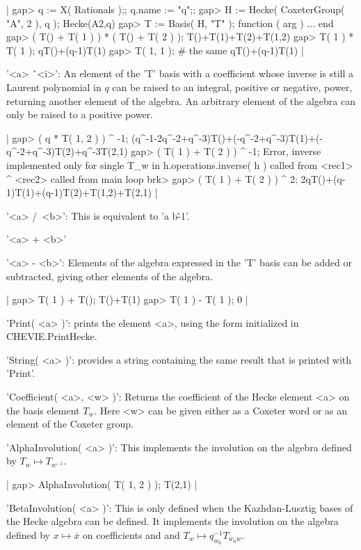 |    gap> q := X( Rationals );; q.name := "q";;
    gap> H := Hecke( CoxeterGroup( "A", 2 ), q );
    Hecke(A2,q)
    gap> T := Basis( H, "T" );
    function ( arg ) ... end
    gap> ( T() + T( 1 ) ) * ( T() + T( 2 ) );
    T()+T(1)+T(2)+T(1,2)
    gap> T( 1 ) * T( 1 );
    qT()+(q-1)T(1)
    gap> T( 1, 1 ); # the same
    qT()+(q-1)T(1) |

'<a> \^\ <i>':
An  element of the  'T' basis with  a coefficient whose  inverse is still a
Laurent  polynomial  in  $q$  can  be  raised  to  an integral, positive or
negative,  power, returning  another element  of the  algebra. An arbitrary
element of the algebra can only be raised to a positive power.

|    gap> ( q * T( 1, 2 ) ) ^ -1;
    (q^-1-2q^-2+q^-3)T()+(-q^-2+q^-3)T(1)+(-q^-2+q^-3)T(2)+q^-3T(2,1)
    gap> ( T( 1 ) + T( 2 ) ) ^ -1;
    Error, inverse implemented only for single T_w in
    h.operations.inverse( h ) called from
    <rec1> ^ <rec2> called from
    main loop
    brk>
    gap> ( T( 1 ) + T( 2 ) ) ^ 2;
    2qT()+(q-1)T(1)+(q-1)T(2)+T(1,2)+T(2,1) |

'<a> /\ <b>': This is equivalent to 'a\* b\^-1'.

'<a> + <b>'

'<a> - <b>':
Elements of the  algebra  expressed in  the  'T'  basis can be   added or
subtracted, giving other elements of the algebra.

|    gap> T( 1 ) + T();
    T()+T(1)
    gap> T( 1 ) - T( 1 );
    0 |

'Print( <a> )':
prints the element <a>, using the form initialized in CHEVIE.PrintHecke.

'String( <a> )':
provides a  string  containing  the same  result  that  is  printed  with
'Print'.

'Coefficient( <a>, <w> )':
Returns the  coefficient of the Hecke  element <a> on the  basis element
$T_w$. Here <w> can  be given either as a Coxeter word  or as an element
of the Coxeter group.

'AlphaInvolution( <a> )':
This   implements the involution   on the algebra  defined by $T_w\mapsto
T_{w^{-1}}$.

|    gap> AlphaInvolution( T( 1, 2 ) );
    T(2,1) |

'BetaInvolution( <a> )':
This  is  only defined  when  the  Kazhdan-Lusztig  bases of  the  Hecke
algebra  can be  defined. It  implements the  involution on  the algebra
defined  by $x\mapsto\overline  x$ on  coefficients and  and $T_w\mapsto
q_{w_0}^{-1}T_{w_0w}$.

